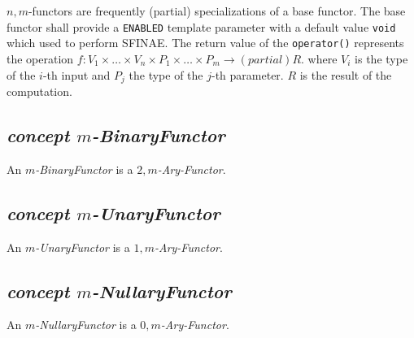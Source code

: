 \noindent{}$n,m$-functors are frequently (partial) specializations of a base functor.
The base functor shall provide a \texttt{ENABLED} template parameter with a default value \texttt{void} which used to perform SFINAE.
\noindent{}The return value of the \texttt{operator()} represents                the operation
$f : V_1 \times \ldots \times V_n \times P_1 \times \ldots \times P_m \rightarrow(partial) R$.
where $V_i$ is the type of the $i$-th input and $P_j$ the type of the $j$-th parameter. $R$ is
the result of the computation.

\subsection{\textit{concept $m$-BinaryFunctor}}
An \textit{$m$-BinaryFunctor} is a \textit{$2,m$-Ary-Functor}.

\subsection{\textit{concept $m$-UnaryFunctor}}
An \textit{$m$-UnaryFunctor} is a \textit{$1,m$-Ary-Functor}.

\subsection{\textit{concept $m$-NullaryFunctor}}
An \textit{$m$-NullaryFunctor} is a \textit{$0,m$-Ary-Functor}.
